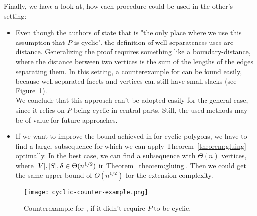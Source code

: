 Finally, we have a look at, how each procedure could be used in the other's setting:

\begin{itemize}
  \item Even though the authors of \cite{kwan2020extension} state that \cite[Lemma~10.2]{kwan2020extension} is "the only place where we use this assumption that $P$ is cyclic", the definition of well-separateness uses arc-distance. Generalizing the proof requires something like a boundary-distance, where the distance between two vertices is the sum of the lengths of the edges separating them. In this setting, a counterexample for \cite[Lemma~10.2]{kwan2020extension} can be found easily, because well-separated facets and vertices can still have small slacks (see Figure~\ref{fig:cyclic-counter-example}).\\
        We conclude that this approach can't be adopted easily for the general case, since it relies on $P$ being cyclic in central parts. Still, the used methods may be of value for future approaches.
  \item If we want to improve the bound achieved in \cite{shitov2020sublinear} for cyclic polygons, we have to find a larger subsequence for which we can apply Theorem~\ref{theorem:gluing} optimally. In the best case, we can find a subsequence with $\Theta(n)$ vertices, where $\lvert V\rvert,\lvert S\rvert,\delta \in \Theta(n^{1/2})$ in Theorem~\ref{theorem:gluing}. Then we could get the same upper bound of $O(n^{1/2})$ for the extension complexity.
\end{itemize}

\begin{figure}[ht]
  \centering
  \texttt{[image: cyclic-counter-example.png]}
  \caption{Counterexample for \cite[Lemma~10.2]{kwan2020extension}, if it didn't require $P$ to be cyclic.}
  \label{fig:cyclic-counter-example}
\end{figure}
